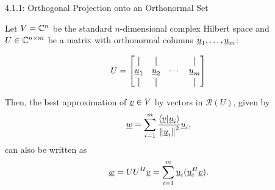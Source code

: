 \documentclass[10pt,letterpaper,english]{beamer}
\begin{document}
\begin{frame}{4.1.1: Orthogonal Projection onto an Orthonormal Set}

Let $V = \mathbb{C}^n$ be the standard $n$-dimensional complex Hilbert space and $U \in \mathbb{C}^{n\times m}$ be a matrix with orthonormal columns $\underline{u}_1,\ldots,\underline{u}_m$:

\[ U = \begin{bmatrix} \vertbar & \vertbar & & \vertbar \\ \vecnot{u}_1 & \vecnot{u}_2 & \cdots & \vecnot{u}_m \\ \vertbar & \vertbar & & \vertbar \end{bmatrix} \]

\vspace{4mm}

Then, the best approximation of $\underline{v}\in V$ by vectors in $\mathcal{R}(U)$, given by
\begin{equation*}
\underline{w} = \sum_{i=1}^m \frac{ \left\langle \underline{v} | \underline{u}_i \right\rangle }{ \left\| \underline{u}_i \right\|^2 } \underline{u}_i,
\end{equation*}
can also be written as
\[ \underline{w} = U U^H \underline{v} = \sum_{i=1}^m \underline{u}_i (\underline{u}_i^H \underline{v}). \]

\end{frame}
\end{document}
